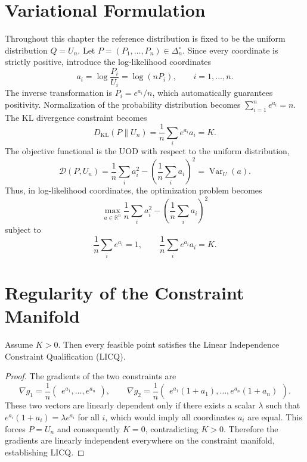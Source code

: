 \section{Variational Formulation}
Throughout this chapter the reference distribution is fixed to be the uniform distribution \(Q=U_n\).
Let \(P=(P_1,\ldots,P_n)\in\Delta_n^\circ\). Since every coordinate is strictly positive, introduce the log-likelihood coordinates
\[
a_i
=
\log\frac{P_i}{U_i}
=
\log(nP_i),\qquad
i=1,\ldots,n.
\]
The inverse transformation is \(P_i=e^{a_i}/n\), which automatically guarantees positivity.
Normalization of the probability distribution becomes
$\sum_{i=1}^{n}e^{a_i}=n.$
The KL divergence constraint becomes
\[
D_{\mathrm{KL}}(P\|U_n)
=
\frac1n\sum_i e^{a_i}a_i
=
K.
\]
The objective functional is the UOD with respect to the uniform distribution,
\[
\mathcal D(P,U_n)
=
\frac1n\sum_i a_i^2
-
\left(\frac1n\sum_i a_i\right)^2
=
\operatorname{Var}_U(a).
\]
Thus, in log-likelihood coordinates, the optimization problem becomes
\[
\max_{a\in\mathbb R^n}
\frac1n\sum_i a_i^2
-
\left(\frac1n\sum_i a_i\right)^2
\]
subject to
\[
\frac1n\sum_i e^{a_i}=1,
\qquad
\frac1n\sum_i e^{a_i}a_i=K.
\]
\section{Regularity of the Constraint Manifold}
\begin{lemma}
\label{ch:lem:29-1}
Assume \(K>0\). Then every feasible point satisfies the Linear Independence Constraint Qualification (LICQ).
\end{lemma}
\begin{proof}
The gradients of the two constraints are
\[
\nabla g_1
=
\frac1n
\begin{pmatrix}
e^{a_1}, \ldots, e^{a_n}
\end{pmatrix},
\qquad
\nabla g_2
=
\frac1n
\begin{pmatrix}
e^{a_1}(1+a_1), \ldots, e^{a_n}(1+a_n)
\end{pmatrix}.
\]
These two vectors are linearly dependent only if there exists a scalar \(\lambda\) such that \(e^{a_i}(1+a_i)=\lambda e^{a_i}\) for all \(i\), which would imply all coordinates \(a_i\) are equal. This forces \(P=U_n\) and consequently \(K=0\), contradicting \(K>0\). Therefore the gradients are linearly independent everywhere on the constraint manifold, establishing LICQ. 
\end{proof}
